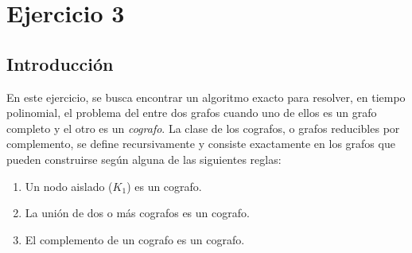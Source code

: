 \section{Ejercicio 3}


\subsection{Introducción}
En este ejercicio, se busca encontrar un algoritmo exacto para resolver, en
tiempo polinomial, el problema del  entre dos grafos cuando uno de
ellos es un grafo completo y el otro es un \emph{cografo}. La clase de los
cografos, o grafos reducibles por complemento, se define recursivamente y
consiste exactamente en los grafos que pueden construirse según alguna de las
siguientes reglas:
\begin{enumerate}
    \item Un nodo aislado ($K_1$) es un cografo.
    \item La unión de dos o más cografos es un cografo.
    \item El complemento de un cografo es un cografo.
\end{enumerate}


